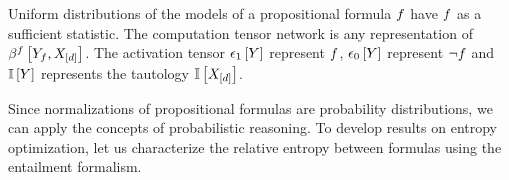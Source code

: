 \begin{remark}
    Uniform distributions of the models of a propositional formula $f$ have $f$ as a sufficient statistic.
    The computation tensor network is any representation of $\beta^{f}\left[Y_{f},X_{[d]}\right]$.
    The activation tensor $\epsilon_1\left[Y\right]$ represent $f$, $\epsilon_0\left[Y\right]$ represent $\lnot f$ and $\mathbb{I}\left[Y\right]$ represents the tautology $\mathbb{I}\left[X_{[d]}\right]$.
\end{remark}


Since normalizations of propositional formulas are probability distributions, we can apply the concepts of probabilistic reasoning.
To develop results on entropy optimization, let us characterize the relative entropy between formulas using the entailment formalism.


